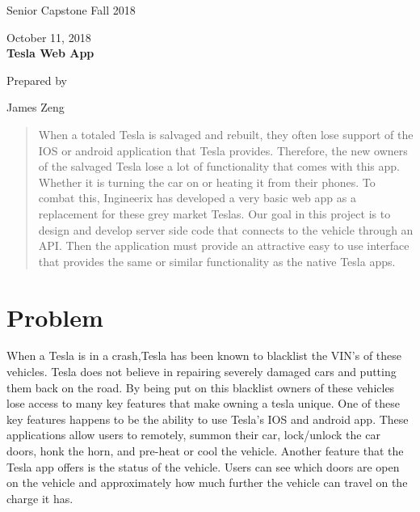 \documentclass[draftclsnofoot, onecolumn, compsoc, 10pt]{IEEEtran}
\def \TeamNumber{		James Zeng	}
\def \ProjectName{		Tesla Web App }
\begin{document}
\begin{titlepage}
    \begin{singlespace}
        \hfill
        \par\vspace{.2in}
        \centering
        \scshape{
            \huge Senior Capstone Fall 2018\par
            October 11, 2018\\
            \vspace{1in}
            \textbf{\Huge\ProjectName}\par
            \vspace{1in}
            {\large Prepared by }\par
            \TeamNumber\par
            \vspace{5pt}
            \vspace{20pt}
        }
\begin{abstract}
When a totaled Tesla is salvaged and rebuilt, they often lose support of the IOS or android application that Tesla provides. Therefore, the new owners of the salvaged Tesla lose a lot of functionality that comes with this app. Whether it is turning the car on or heating it from their phones. To combat this, Ingineerix has developed a very basic web app as a replacement for these grey market Teslas. Our goal in this project is to design and develop server side code that connects to the vehicle through an API. Then the application must provide an attractive easy to use interface that provides the same or similar functionality as the native Tesla apps.
\end{abstract}
        \vfill
    \end{singlespace}
\end{titlepage}
\newpage
{}
\clearpage
\pagebreak
\section{Problem}
When a Tesla is in a crash,Tesla has been known to blacklist the VIN’s of these vehicles. Tesla does not believe in repairing severely damaged cars and putting them back on the road. By being put on this blacklist owners of these vehicles lose access to many key features that make owning a tesla unique. One of these key features happens to be the ability to use Tesla’s IOS and android app. These applications allow users to remotely, summon their car, lock/unlock the car doors, honk the horn, and pre-heat or cool the vehicle. Another feature that the Tesla app offers is the status of the vehicle. Users can see which doors are open on the vehicle and approximately how much further the vehicle can travel on the charge it has.
\end{document}
